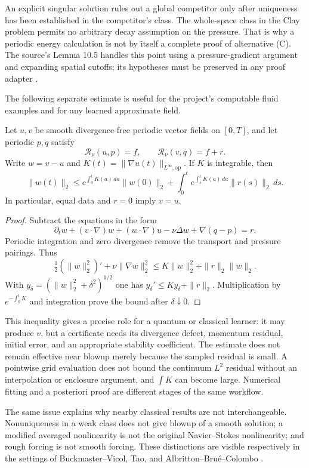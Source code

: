 An explicit singular solution rules out a global competitor only after
uniqueness has been established in the competitor's class. The whole-space
class in the Clay problem permits no arbitrary decay assumption on the
pressure. That is why a periodic energy calculation is not by itself a
complete proof of alternative (C). The source's Lemma 10.5 handles this
point using a pressure-gradient argument and expanding spatial cutoffs;
its hypotheses must be preserved in any proof adapter
\citep{NSOpenAI2026}.

The following separate estimate is useful for the project's computable
fluid examples and for any learned approximate field.

\begin{proposition}
\label{prop:ns-residual-comparison}
Let $u,v$ be smooth divergence-free periodic vector fields on $[0,T]$,
and let periodic $p,q$ satisfy
\[
 \mathcal R_\nu(u,p)=f,\qquad
 \mathcal R_\nu(v,q)=f+r.
\]
Write $w=v-u$ and $K(t)=\|\nabla u(t)\|_{L^\infty,\mathrm{op}}$.
If $K$ is integrable, then
\[
 \|w(t)\|_2\leq
 e^{\int_0^tK(a)\,da}\|w(0)\|_2
 +\int_0^t e^{\int_s^tK(a)\,da}\|r(s)\|_2\,ds.
\]
In particular, equal data and $r=0$ imply $v=u$.
\end{proposition}
\begin{proof}
Subtract the equations in the form
\[
 \partial_tw+(v\cdot\nabla)w+(w\cdot\nabla)u
 -\nu\Delta w+\nabla(q-p)=r.
\]
Periodic integration and zero divergence remove the transport and pressure
pairings. Thus
\[
 \tfrac12(\|w\|_2^2)'+\nu\|\nabla w\|_2^2
 \leq K\|w\|_2^2+\|r\|_2\|w\|_2.
\]
With $y_\delta=(\|w\|_2^2+\delta^2)^{1/2}$ one has
$y_\delta'\leq Ky_\delta+\|r\|_2$. Multiplication by
$e^{-\int_0^tK}$ and integration prove the bound after
$\delta\downarrow0$.
\end{proof}

This inequality gives a precise role for a quantum or classical learner:
it may produce $v$, but a certificate needs its divergence defect, momentum
residual, initial error, and an appropriate stability coefficient. The
estimate does not remain effective near blowup merely because the sampled
residual is small. A pointwise grid evaluation does not bound the continuum
$L^2$ residual without an interpolation or enclosure argument, and
$\int K$ can become large. Numerical fitting and a posteriori proof are
different stages of the same workflow.

The same issue explains why nearby classical results are not interchangeable.
Nonuniqueness in a weak class does not give blowup of a smooth solution;
a modified averaged nonlinearity is not the original Navier--Stokes
nonlinearity; and rough forcing is not smooth forcing. These distinctions
are visible respectively in the settings of Buckmaster--Vicol,
Tao, and Albritton--Bru\'e--Colombo
\citep{NSBuckmasterVicol2019,NSTao2016,NSAlbrittonBrueColombo2022}.


